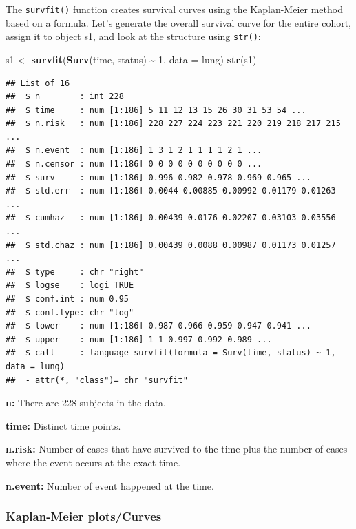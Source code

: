 \documentclass[
]{book}
\newenvironment{Shaded}{\begin{snugshade}}{\end{snugshade}}
\newcommand{\AttributeTok}[1]{\textcolor[rgb]{0.13,0.29,0.53}{#1}}
\newcommand{\DecValTok}[1]{\textcolor[rgb]{0.00,0.00,0.81}{#1}}
\newcommand{\FunctionTok}[1]{\textcolor[rgb]{0.13,0.29,0.53}{\textbf{#1}}}
\newcommand{\NormalTok}[1]{#1}
\newcommand{\OtherTok}[1]{\textcolor[rgb]{0.56,0.35,0.01}{#1}}
\newcommand{\SpecialCharTok}[1]{\textcolor[rgb]{0.81,0.36,0.00}{\textbf{#1}}}
\begin{document}
The \texttt{survfit()} function creates survival curves using the Kaplan-Meier method based on a formula. Let's generate the overall survival curve for the entire cohort, assign it to object s1, and look at the structure using \texttt{str()}:

\begin{Shaded}
\begin{Highlighting}[]
\NormalTok{s1 }\OtherTok{\textless{}{-}} \FunctionTok{survfit}\NormalTok{(}\FunctionTok{Surv}\NormalTok{(time, status) }\SpecialCharTok{\textasciitilde{}} \DecValTok{1}\NormalTok{, }\AttributeTok{data =}\NormalTok{ lung)}
\FunctionTok{str}\NormalTok{(s1)}
\end{Highlighting}
\end{Shaded}

\begin{verbatim}
## List of 16
##  $ n        : int 228
##  $ time     : num [1:186] 5 11 12 13 15 26 30 31 53 54 ...
##  $ n.risk   : num [1:186] 228 227 224 223 221 220 219 218 217 215 ...
##  $ n.event  : num [1:186] 1 3 1 2 1 1 1 1 2 1 ...
##  $ n.censor : num [1:186] 0 0 0 0 0 0 0 0 0 0 ...
##  $ surv     : num [1:186] 0.996 0.982 0.978 0.969 0.965 ...
##  $ std.err  : num [1:186] 0.0044 0.00885 0.00992 0.01179 0.01263 ...
##  $ cumhaz   : num [1:186] 0.00439 0.0176 0.02207 0.03103 0.03556 ...
##  $ std.chaz : num [1:186] 0.00439 0.0088 0.00987 0.01173 0.01257 ...
##  $ type     : chr "right"
##  $ logse    : logi TRUE
##  $ conf.int : num 0.95
##  $ conf.type: chr "log"
##  $ lower    : num [1:186] 0.987 0.966 0.959 0.947 0.941 ...
##  $ upper    : num [1:186] 1 1 0.997 0.992 0.989 ...
##  $ call     : language survfit(formula = Surv(time, status) ~ 1, data = lung)
##  - attr(*, "class")= chr "survfit"
\end{verbatim}

\textbf{n:} There are 228 subjects in the data.

\textbf{time:} Distinct time points.

\textbf{n.risk:} Number of cases that have survived to the time plus the number of cases where the event occurs at the exact time.

\textbf{n.event:} Number of event happened at the time.

\hypertarget{kaplan-meier-plotscurves}{%
\subsubsection{Kaplan-Meier plots/Curves}\label{kaplan-meier-plotscurves}}
\end{document}
